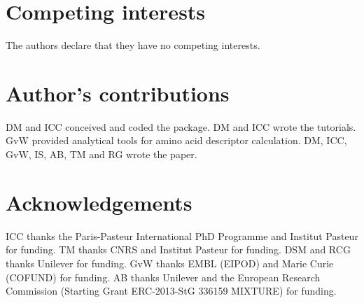 \documentclass{bmcart}
\begin{document}

\begin{backmatter}

\section*{Competing interests}
  The authors declare that they have no competing interests.

\section*{Author's contributions}
DM and ICC conceived and coded the package.
DM and ICC wrote the tutorials.
GvW provided analytical tools for amino acid descriptor calculation.
DM, ICC, GvW, IS, AB, TM and RG wrote the paper.

\section*{Acknowledgements}
ICC thanks the Paris-Pasteur International PhD Programme and Institut Pasteur for funding.
TM thanks CNRS and Institut Pasteur for funding.
DSM and RCG thanks Unilever for funding.
GvW thanks EMBL (EIPOD) and Marie Curie (COFUND) for funding.
AB thanks Unilever and the European Research Commission (Starting Grant ERC-2013-StG 336159 MIXTURE) for funding.




\end{backmatter}
\end{document}
